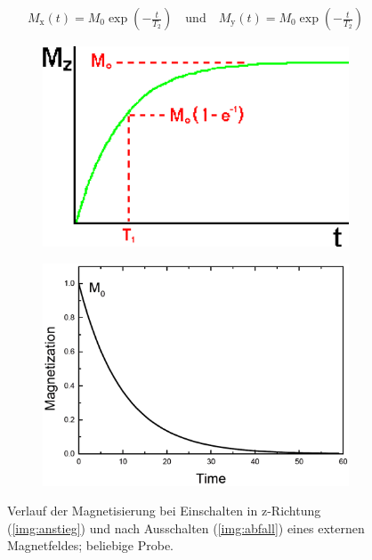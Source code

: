 \documentclass[numbers=noenddot,a4paper,notitlepage,twoside,BCOR15mm]{scrartcl}
\newcommand{\ix}[1]{_\text{#1}}
\begin{document}
					\begin{align}
					M\ix{x}(t)=M\ix{0}\exp\left(-\frac{t}{T\ix{2}}\right) \quad\text{und}\quad M\ix{y}(t)=M\ix{0}\exp\left(-\frac{t}{T\ix{2}}\right) \label{eq:spinspin}
					\end{align}

					\begin{figure}
						\centering
						\begin{subfigure}[h]{0.48\textwidth}
							\centering
							\includegraphics[width=\textwidth]{mzanstieg.png}
							\caption{}
							\label{img:anstieg}
						\end{subfigure}
						\begin{subfigure}[h]{0.48\textwidth}
							\centering
							\includegraphics[width=\textwidth]{abfallm.png}
							\caption{}
							\label{img:abfall}
						\end{subfigure}
						\caption{Verlauf der Magnetisierung bei Einschalten  in z-Richtung (\autoref{img:anstieg}) und nach Ausschalten (\autoref{img:abfall}) eines externen Magnetfeldes; beliebige Probe. \cite{TeachSpinNMR}}
					\end{figure}
\end{document}
